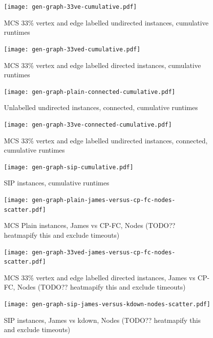 \documentclass[letterpaper]{article}
\begin{document}
\begin{figure}
    \centering
    \texttt{[image: gen-graph-33ve-cumulative.pdf]}
    \caption{MCS 33\% vertex and edge labelled undirected instances, cumulative runtimes}\label{figure:33ve-cumulative}
\end{figure}

\begin{figure}
    \centering
    \texttt{[image: gen-graph-33ved-cumulative.pdf]}
    \caption{MCS 33\% vertex and edge labelled directed instances, cumulative runtimes}\label{figure:33ved-cumulative}
\end{figure}

\begin{figure}
    \centering
    \texttt{[image: gen-graph-plain-connected-cumulative.pdf]}
    \caption{Unlabelled undirected instances, connected, cumulative runtimes}\label{figure:plain-connected-cumulative}
\end{figure}

\begin{figure}
    \centering
    \texttt{[image: gen-graph-33ve-connected-cumulative.pdf]}
    \caption{MCS 33\% vertex and edge labelled undirected instances, connected, cumulative runtimes}\label{figure:33ve-connected-cumulative}
\end{figure}

\begin{figure}
    \centering
    \texttt{[image: gen-graph-sip-cumulative.pdf]}
    \caption{SIP instances, cumulative runtimes}\label{figure:sip-cumulative}
\end{figure}

\begin{figure}
    \centering
    \texttt{[image: gen-graph-plain-james-versus-cp-fc-nodes-scatter.pdf]}
    \caption{MCS Plain instances, James vs CP-FC, Nodes (TODO?? heatmapify this
    and exclude timeouts)}\label{figure:plain-james-versus-cp-fc-nodes-scatter}
\end{figure}

\begin{figure}
    \centering
    \texttt{[image: gen-graph-33ved-james-versus-cp-fc-nodes-scatter.pdf]}
    \caption{MCS 33\% vertex and edge labelled directed instances, James vs
    CP-FC, Nodes (TODO?? heatmapify this and exclude
    timeouts)}\label{figure:33ved-james-versus-cp-fc-nodes-scatter}
\end{figure}

\begin{figure}
    \centering
    \texttt{[image: gen-graph-sip-james-versus-kdown-nodes-scatter.pdf]}
    \caption{SIP instances, James vs kdown, Nodes (TODO?? heatmapify this and exclude
    timeouts)}\label{figure:sip-james-versus-kdown-nodes-scatter}
\end{figure}
\end{document}
